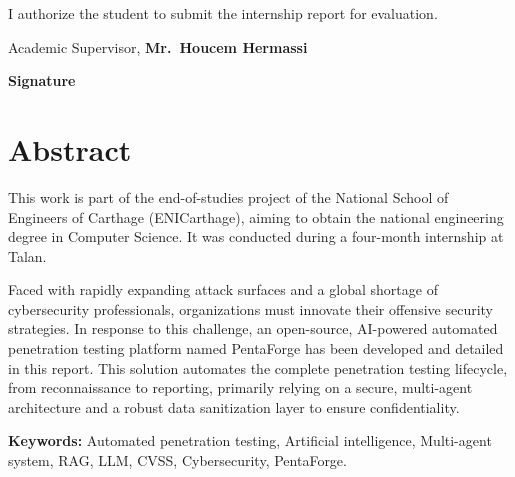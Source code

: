 \documentclass[12pt,a4paper]{report}
\begin{document}
\vspace{1.1cm}

\begin{tcolorbox}[
    enhanced,
    colback=white,
    colframe=black!70,
    boxrule=0.9pt,
    arc=4mm,
    width=\textwidth,
    left=12mm,
    right=12mm,
    top=11mm,
    bottom=11mm
]
I authorize the student to submit the internship report for evaluation.

\vspace{1.1cm}

\centering
Academic Supervisor, \textbf{Mr.\ Houcem Hermassi}

\vspace{1.6cm}

\begin{flushright}
\textbf{Signature}
\end{flushright}
\end{tcolorbox}

\newpage
\thispagestyle{fancy}
\section*{Abstract}

This work is part of the end-of-studies project of the National School of Engineers of Carthage (ENICarthage), aiming to obtain the national engineering degree in Computer Science. It was conducted during a four-month internship at Talan.

Faced with rapidly expanding attack surfaces and a global shortage of cybersecurity professionals, organizations must innovate their offensive security strategies. In response to this challenge, an open-source, AI-powered automated penetration testing platform named PentaForge has been developed and detailed in this report. This solution automates the complete penetration testing lifecycle, from reconnaissance to reporting, primarily relying on a secure, multi-agent architecture and a robust data sanitization layer to ensure confidentiality.

\vspace{0.4cm}
\noindent \textbf{Keywords:} Automated penetration testing, Artificial intelligence,
Multi-agent system, RAG, LLM, CVSS, Cybersecurity, PentaForge.
\end{document}
